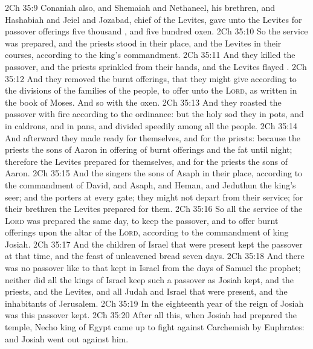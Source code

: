 \vs 2Ch 35:9 Conaniah also, and Shemaiah and Nethaneel, his brethren, and Hashabiah and Jeiel and Jozabad, chief of the Levites, gave unto the Levites for passover offerings five thousand , and five hundred oxen.
\vs 2Ch 35:10 So the service was prepared, and the priests stood in their place, and the Levites in their courses, according to the king's commandment.
\vs 2Ch 35:11 And they killed the passover, and the priests sprinkled  from their hands, and the Levites flayed .
\vs 2Ch 35:12 And they removed the burnt offerings, that they might give according to the divisions of the families of the people, to offer unto the \textsc{Lord}, as  written in the book of Moses. And so  with the oxen.
\vs 2Ch 35:13 And they roasted the passover with fire according to the ordinance: but the  holy  sod they in pots, and in caldrons, and in pans, and divided  speedily among all the people.
\vs 2Ch 35:14 And afterward they made ready for themselves, and for the priests: because the priests the sons of Aaron  in offering of burnt offerings and the fat until night; therefore the Levites prepared for themselves, and for the priests the sons of Aaron.
\vs 2Ch 35:15 And the singers the sons of Asaph  in their place, according to the commandment of David, and Asaph, and Heman, and Jeduthun the king's seer; and the porters  at every gate; they might not depart from their service; for their brethren the Levites prepared for them.
\vs 2Ch 35:16 So all the service of the \textsc{Lord} was prepared the same day, to keep the passover, and to offer burnt offerings upon the altar of the \textsc{Lord}, according to the commandment of king Josiah.
\vs 2Ch 35:17 And the children of Israel that were present kept the passover at that time, and the feast of unleavened bread seven days.
\vs 2Ch 35:18 And there was no passover like to that kept in Israel from the days of Samuel the prophet; neither did all the kings of Israel keep such a passover as Josiah kept, and the priests, and the Levites, and all Judah and Israel that were present, and the inhabitants of Jerusalem.
\vs 2Ch 35:19 In the eighteenth year of the reign of Josiah was this passover kept.
\vs 2Ch 35:20 After all this, when Josiah had prepared the temple, Necho king of Egypt came up to fight against Carchemish by Euphrates: and Josiah went out against him.
